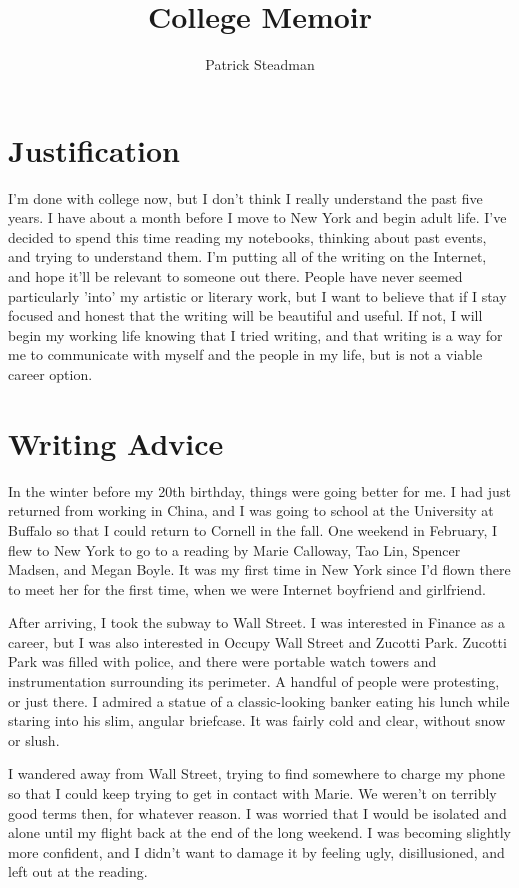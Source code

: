 \documentclass[12pt]{article}
\title{College Memoir}
\author{Patrick Steadman}
\begin{document}
\maketitle

\section{Justification}
I'm done with college now, but I don't think I really understand the past five
years.  I have about a month before I move to New York and begin adult life.
I've decided to spend this time reading my notebooks, thinking about past
events, and trying to understand them.  I'm putting all of the writing on the
Internet, and hope it'll be relevant to someone out there.  People have never
seemed particularly 'into' my artistic or literary work, but I want to believe
that if I stay focused and honest that the writing will be beautiful and
useful.  If not, I will begin my working life knowing that I tried writing, and
that writing is a way for me to communicate with myself and the people in my
life, but is not a viable career option.

\section{Writing Advice}
In the winter before my 20th birthday, things were going better for me.  I had
just returned from working in China, and I was going to school at the University
at Buffalo so that I could return to Cornell in the fall.  One weekend in
February, I flew to New York to go to a reading by Marie Calloway, Tao Lin,
Spencer Madsen, and Megan Boyle.  It was my first time in New York since I'd
flown there to meet her for the first time, when we were Internet boyfriend and
girlfriend.  

After arriving, I took the subway to Wall Street.  I was interested in Finance
as a career, but I was also interested in Occupy Wall Street and Zucotti Park.
Zucotti Park was filled with police, and there were portable watch towers and
instrumentation surrounding its perimeter.  A handful of people were protesting,
or just there.  I admired a statue of a classic-looking banker eating his lunch
while staring into his slim, angular briefcase.  It was fairly cold and clear,
without snow or slush.

I wandered away from Wall Street, trying to find somewhere to charge my phone so
that I could keep trying to get in contact with Marie.  We weren't on terribly
good terms then, for whatever reason.  I was worried that I would be isolated
and alone until my flight back at the end of the long weekend.  I was becoming
slightly more confident, and I didn't want to damage it by feeling ugly,
disillusioned, and left out at the reading.
\end{document}
